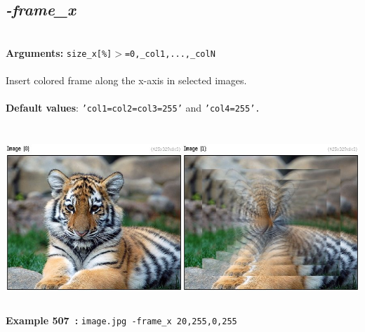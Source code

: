 \documentclass[a4paper,11pt,twoside]{book}
\begin{document}
\subsection{\emph{-frame\_x} }\vspace*{-0.5em}
~\\\textbf{Arguments: } 
{\small \texttt{size\_x[\%]$>$=0,\_col1,...,\_colN}}\\~\\
Insert colored frame along the x-axis in selected images.
~\\~\\\textbf{Default values}: {\small \texttt{'col1=col2=col3=255'} and \texttt{'col4=255'.}}
\begin{center}\includegraphics[keepaspectratio=true,height=7cm,width=\textwidth]{img/gmic_def507.jpg}\\
{\footnotesize \textbf{Example 507~:} \texttt{image.jpg -frame\_x 20,255,0,255}}
\end{center}
\end{document}
